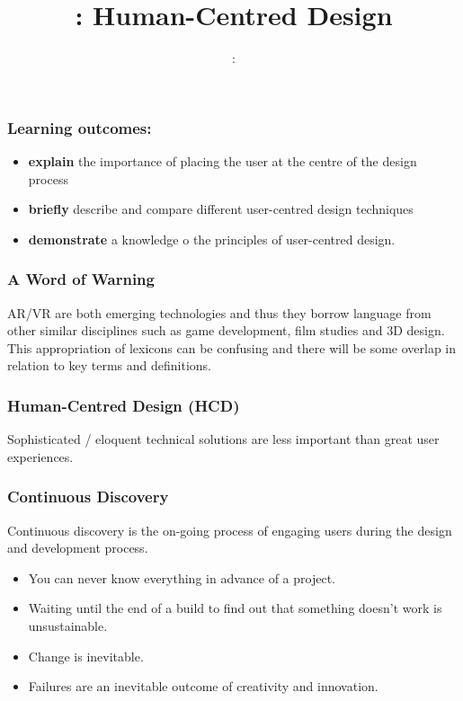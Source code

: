 \usepackage{../../beamerthemeFalmouthGamesAcademy}
\usepackage{multimedia}
\usepackage{soul}
\graphicspath{ {../../} }


\usepackage[normalem]{ulem}
\usepackage{wasysym}

\usepackage{pdfpages}

\usetikzlibrary{arrows,automata}




\title{\sessionnumber: Human-Centred Design}
\subtitle{\modulecode: \moduletitle}

\frame{\titlepage} 

\begin{frame}
	\frametitle{Learning outcomes:}
	\begin{itemize}
		\item \textbf{explain} the importance of placing the user at the centre of the design process
		\item \textbf{briefly} describe and compare different user-centred design techniques
		\item \textbf{demonstrate} a knowledge o the principles of user-centred design.	
	\end{itemize}
\end{frame}

\begin{frame}
	\frametitle{A Word of Warning}
	AR/VR are both emerging technologies and thus they borrow language from other similar disciplines such as game development, film studies and 3D design. This appropriation of lexicons can be confusing and there will be some overlap in relation to key terms and definitions.
\end{frame}

\begin{frame}
	\frametitle{Human-Centred Design (HCD)}
	
	Sophisticated / eloquent technical solutions are less important than great user experiences.
\end{frame}

\begin{frame}
	\frametitle{Continuous Discovery}
	Continuous discovery is the on-going process of engaging users during the design and development process. 
	\begin{itemize}
		\item \pause You can never know everything in advance of a project.
		\item \pause Waiting until the end of a build to find out that something doesn't work is unsustainable. 
		\item \pause Change is inevitable.
		\item \pause Failures are an inevitable outcome of creativity and innovation. 
	\end{itemize}
\end{frame}	

